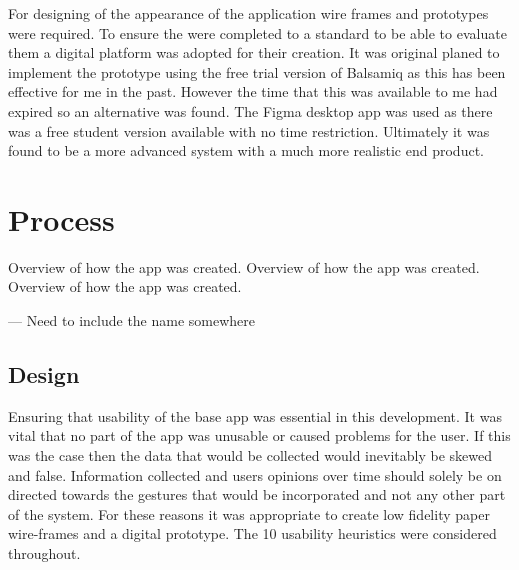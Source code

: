 \documentclass{l4proj}
\begin{document}
For designing of the appearance of the application wire frames and prototypes were required. To ensure the were completed to a standard to be able to evaluate them a digital platform was adopted for their creation. It was original planed to implement the prototype using the free trial version of Balsamiq as this has been effective for me in the past. However the time that this was available to me had expired so an alternative was found. The Figma desktop app was used as there was a free student version available with no time restriction. Ultimately it was found to be a more advanced system with a much more realistic end product.


\section{Process}
Overview of how the app was created. Overview of how the app was created. Overview of how the app was created.

--- Need to include the name somewhere



\subsection{Design}
Ensuring that usability of the base app was essential in this development. It was vital that no part of the app was unusable or caused problems for the user. If this was the case then the data that would be collected would inevitably be skewed and false. Information collected and users opinions over time should solely be on directed towards the gestures that would be incorporated and not any other part of the system. For these reasons it was appropriate to create low fidelity paper wire-frames and a digital prototype. The 10 usability heuristics were considered throughout.
\end{document}

